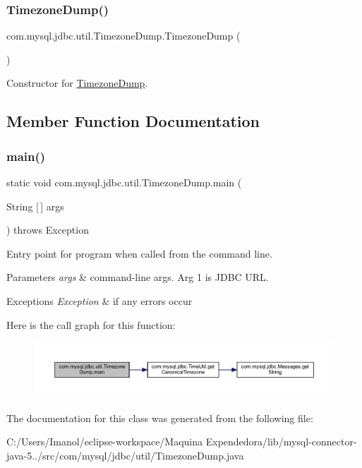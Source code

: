 \subsubsection{\texorpdfstring{Timezone\+Dump()}{TimezoneDump()}}
{\footnotesize\ttfamily com.\+mysql.\+jdbc.\+util.\+Timezone\+Dump.\+Timezone\+Dump (\begin{DoxyParamCaption}{ }\end{DoxyParamCaption})}

Constructor for \mbox{\hyperlink{classcom_1_1mysql_1_1jdbc_1_1util_1_1_timezone_dump}{Timezone\+Dump}}. 

\subsection{Member Function Documentation}
\mbox{\label{classcom_1_1mysql_1_1jdbc_1_1util_1_1_timezone_dump_a621749317f16279559fa29fd9bb55fd7}} 
\subsubsection{\texorpdfstring{main()}{main()}}
{\footnotesize\ttfamily static void com.\+mysql.\+jdbc.\+util.\+Timezone\+Dump.\+main (\begin{DoxyParamCaption}\item[{String \mbox{[}$\,$\mbox{]}}]{args }\end{DoxyParamCaption}) throws Exception\hspace{0.3cm}{\ttfamily [static]}}

Entry point for program when called from the command line.


\begin{DoxyParams}{Parameters}
{\em args} & command-\/line args. Arg 1 is J\+D\+BC U\+RL. \\
\hline
\end{DoxyParams}

\begin{DoxyExceptions}{Exceptions}
{\em Exception} & if any errors occur \\
\hline
\end{DoxyExceptions}
Here is the call graph for this function\+:
\nopagebreak
\begin{figure}[H]
\begin{center}
\leavevmode
\includegraphics[width=350pt]{classcom_1_1mysql_1_1jdbc_1_1util_1_1_timezone_dump_a621749317f16279559fa29fd9bb55fd7_cgraph}
\end{center}
\end{figure}


The documentation for this class was generated from the following file\+:\begin{DoxyCompactItemize}
\item 
C\+:/\+Users/\+Imanol/eclipse-\/workspace/\+Maquina Expendedora/lib/mysql-\/connector-\/java-\/5../src/com/mysql/jdbc/util/Timezone\+Dump.\+java\end{DoxyCompactItemize}
